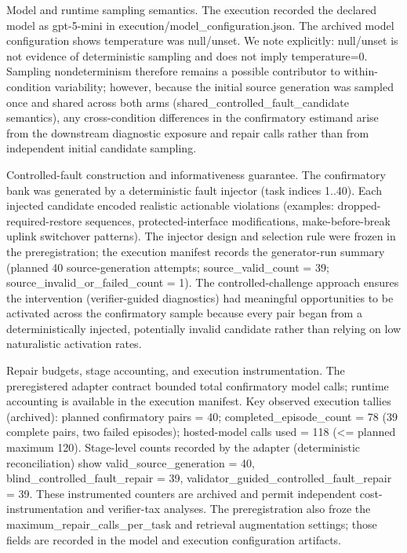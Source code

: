 \documentclass[conference]{IEEEtran}
\begin{document}
Model and runtime sampling semantics. The execution recorded the declared model as gpt-5-mini in execution/model\_configuration.json. The archived model configuration shows temperature was null/unset. We note explicitly: null/unset is not evidence of deterministic sampling and does not imply temperature=0. Sampling nondeterminism therefore remains a possible contributor to within-condition variability; however, because the initial source generation was sampled once and shared across both arms (shared\_controlled\_fault\_candidate semantics), any cross-condition differences in the confirmatory estimand arise from the downstream diagnostic exposure and repair calls rather than from independent initial candidate sampling.

Controlled-fault construction and informativeness guarantee. The confirmatory bank was generated by a deterministic fault injector (task indices 1..40). Each injected candidate encoded realistic actionable violations (examples: dropped-required-restore sequences, protected-interface modifications, make-before-break uplink switchover patterns). The injector design and selection rule were frozen in the preregistration; the execution manifest records the generator-run summary (planned 40 source-generation attempts; source\_valid\_count = 39; source\_invalid\_or\_failed\_count = 1). The controlled-challenge approach ensures the intervention (verifier-guided diagnostics) had meaningful opportunities to be activated across the confirmatory sample because every pair began from a deterministically injected, potentially invalid candidate rather than relying on low naturalistic activation rates.

Repair budgets, stage accounting, and execution instrumentation. The preregistered adapter contract bounded total confirmatory model calls; runtime accounting is available in the execution manifest. Key observed execution tallies (archived): planned confirmatory pairs = 40; completed\_episode\_count = 78 (39 complete pairs, two failed episodes); hosted-model calls used = 118 (<= planned maximum 120). Stage-level counts recorded by the adapter (deterministic reconciliation) show valid\_source\_generation = 40, blind\_controlled\_fault\_repair = 39, validator\_guided\_controlled\_fault\_repair = 39. These instrumented counters are archived and permit independent cost-instrumentation and verifier-tax analyses. The preregistration also froze the maximum\_repair\_calls\_per\_task and retrieval augmentation settings; those fields are recorded in the model and execution configuration artifacts.
\end{document}
